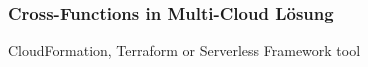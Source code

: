 \documentclass[11pt]{article}
\begin{document}
 
 
 
 

\subsubsection{Cross-Functions in Multi-Cloud Lösung}

CloudFormation, Terraform or Serverless Framework tool \cite{ivanov2018implementation}
\end{document}
